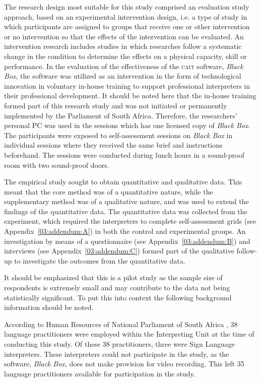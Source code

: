 \documentclass[output=paper]{langsci/langscibook}
\begin{document}
The research design most suitable for this study comprised an evaluation study approach, based on an experimental intervention design, i.e. a type of study in which participants are assigned to groups that receive one or other intervention or no intervention so that the effects of the intervention can be evaluated. An intervention research includes studies in which researches follow a systematic change in the condition to determine the effects on a physical capacity, skill or performance. In the evaluation of the effectiveness of the \textsc{cait} software, \textit{Black Box}, the software was utilized as an intervention in the form of technological innovation in voluntary in-house training to support professional interpreters in their professional development. It should be noted here that the in-house training formed part of this research study and was not initiated or permanently implemented by the Parliament of South Africa. Therefore, the researchers’ personal PC was used in the sessions which has one licensed copy of \textit{Black Box}. The participants were exposed to self-assessment sessions on \textit{Black Box} in individual sessions where they received the same brief and instructions beforehand. The sessions were conducted during lunch hours in a sound-proof room with two sound-proof doors. 

The empirical study sought to obtain quantitative and qualitative data. This meant that the core method was of a quantitative nature, while the supplementary method was of a qualitative nature, and was used to extend the findings of the quantitative data. The quantitative data was collected from the experiment, which required the interpreters to complete self-assessment grids (see Appendix~\ref{03:addendum:A})
in both the control and experimental groups. An investigation by means of a questionnaire (see Appendix~\ref{03:addendum:B}) and interviews (see Appendix~\ref{03:addendum:C}) formed part of the qualitative follow-up to investigate the outcomes from the quantitative data.

It should be emphasized that this is a pilot study as the sample size of respondents is extremely small and may contribute to the data not being statistically significant. To put this into context the following background information should be noted. 

According to Human Resources of National Parliament of South Africa \citep{Moorad2017}, 38 language practitioners were employed within the Interpreting Unit at the time of conducting this study. Of these 38 practitioners, three were Sign Language interpreters. These interpreters could not participate in the study, as the software, \textit{Black Box}, does not make provision for video recording. This left 35 language practitioners available for participation in the study. 
\end{document}
